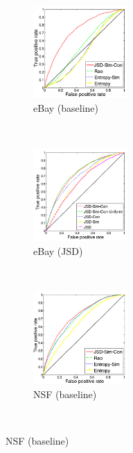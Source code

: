 \documentclass{article} %
\begin{document}
\begin{figure}
        \centering
        \begin{subfigure}[b]{0.24\textwidth}
                \centering
                \includegraphics[width=36mm]{figures/phonecases-comparison-kopia.png}
               \caption{eBay (baseline)}
                \label{fig:phonecases-comparison}
        \end{subfigure}%
              ~ %
        \begin{subfigure}[b]{0.24\textwidth}
                \centering
                \includegraphics[width=36mm]{figures/phonecases-breakdown-kopia.png}
                \caption{eBay (JSD)}
                \label{fig:phonecases-breakdown}
        \end{subfigure}\nobreak
              ~ %
        \begin{subfigure}[b]{0.24\textwidth}
                \centering
                \includegraphics[width=36mm]{figures/nsf-comparison-kopia.png}
                \caption{NSF (baseline)}
                \label{fig:nsf-comparison}
        \end{subfigure}%
        ~ %

\end{figure}
\end{document}
